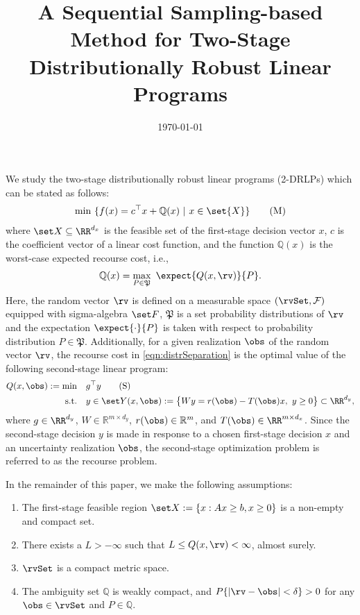 \documentclass[11pt]{article}
\title{A Sequential Sampling-based Method for Two-Stage Distributionally Robust Linear Programs}
\date{\today}
\author{}
\newcommand{\worstQ}{\mathbb{Q}}
\newcommand{\probset}{\mathfrak{P}}
\begin{document}
\maketitle
We study the two-stage distributionally robust linear programs (2-DRLPs) which can be stated as follows:%
\begin{align}
\min~ \{f(x) = c^\top x + \worstQ(x) ~|~ x \in \set{X} \} \tag{M} \label{eqn:TSDR-LP_master}
\end{align}
where $\set X \subseteq \RR^{d_x}$ is the feasible set of the first-stage decision vector $x$, $c$ is the coefficient vector of a linear cost function, and the function $\worstQ(x)$ is the worst-case expected recourse cost, i.e., %
\begin{align}
    \worstQ(x) = \max_{P\in\probset}~ \expect{Q(x,\rv)}{P}. \label{eqn:distrSeparation}
\end{align}
Here, the random vector $\rv$ is defined on a measurable space $(\rvSet, \cal F)$ equipped with  sigma-algebra $\set F$, $\probset$ is a set probability distributions of $\rv$ and the expectation $\expect{\cdot}{P}$ is taken with respect to probability distribution $P \in \probset$. Additionally, for a given realization $\obs$ of the random vector $\rv$, the recourse cost in \eqref{eqn:distrSeparation} is the optimal value of the following second-stage linear program:
\begin{align} \label{eqn:subproblem}
    Q(x,\obs) := \min \quad & g^\top y \tag{S} \\
    \text{s.t.} \quad
    & y \in \set Y(x,\obs) := \big\{W y = r(\obs) - T(\obs) x,~ y \geq 0\big\} \subset \RR^{d_y}, \notag
\end{align}
where $g\in \RR^{d_y}$, $W \in \mathbb{R}^{m \times d_y}$, $r(\obs)\in \mathbb{R}^m$, and $T(\obs)\in \RR^{m\times d_x}$. Since the second-stage decision $y$ is made in response to a chosen first-stage decision $x$ and an uncertainty realization $\obs$, the second-stage optimization problem is referred to as the recourse problem. 

\gap
In the remainder of this paper, we make the following assumptions:
\begin{enumerate}[label=(A\arabic{enumi})]
    \item The first-stage feasible region $\set X:= \{x: Ax \geq b, x \geq 0\}$ is a non-empty and compact set. \label{assum:compactX}
    \item There exists a $L > -\infty$ such that $L \leq Q(x,\rv) < \infty$, almost surely. \label{assum:completeRecourse}
    \item $\rvSet$ is a compact metric space. \label{assum:compactRV}
    \item The ambiguity set $\worstQ$ is weakly compact, and $P\{|\rv - \obs| < \delta\} > 0$ for any $\obs \in \rvSet$ and $P \in \worstQ$. \label{assum:compactAmb}
\end{enumerate}
\end{document}
